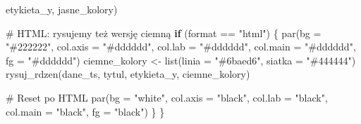 \documentclass[
  polish,
  letterpaper,
  DIV=11,
  numbers=noendperiod]{scrartcl}
\newenvironment{Shaded}{\begin{snugshade}}{\end{snugshade}}
\newcommand{\AttributeTok}[1]{\textcolor[rgb]{0.40,0.45,0.13}{#1}}
\newcommand{\CommentTok}[1]{\textcolor[rgb]{0.37,0.37,0.37}{#1}}
\newcommand{\ControlFlowTok}[1]{\textcolor[rgb]{0.00,0.23,0.31}{\textbf{#1}}}
\newcommand{\FunctionTok}[1]{\textcolor[rgb]{0.28,0.35,0.67}{#1}}
\newcommand{\NormalTok}[1]{\textcolor[rgb]{0.00,0.23,0.31}{#1}}
\newcommand{\OtherTok}[1]{\textcolor[rgb]{0.00,0.23,0.31}{#1}}
\newcommand{\SpecialCharTok}[1]{\textcolor[rgb]{0.37,0.37,0.37}{#1}}
\newcommand{\StringTok}[1]{\textcolor[rgb]{0.13,0.47,0.30}{#1}}
\begin{document}
\begin{Shaded}
\begin{Highlighting}[]
\NormalTok{              etykieta\_y, jasne\_kolory)}
  
  \CommentTok{\# HTML: rysujemy też wersję ciemną}
  \ControlFlowTok{if}\NormalTok{ (format }\SpecialCharTok{==} \StringTok{"html"}\NormalTok{) \{}
    \FunctionTok{par}\NormalTok{(}\AttributeTok{bg =} \StringTok{"\#222222"}\NormalTok{, }\AttributeTok{col.axis =} \StringTok{"\#dddddd"}\NormalTok{, }\AttributeTok{col.lab =} \StringTok{"\#dddddd"}\NormalTok{, }
        \AttributeTok{col.main =} \StringTok{"\#dddddd"}\NormalTok{, }\AttributeTok{fg =} \StringTok{"\#dddddd"}\NormalTok{)}
\NormalTok{    ciemne\_kolory }\OtherTok{\textless{}{-}} \FunctionTok{list}\NormalTok{(}\AttributeTok{linia =} \StringTok{"\#6baed6"}\NormalTok{, }\AttributeTok{siatka =} \StringTok{"\#444444"}\NormalTok{)}
    \FunctionTok{rysuj\_rdzen}\NormalTok{(dane\_ts, tytul, etykieta\_y, ciemne\_kolory)}
    
    \CommentTok{\# Reset po HTML}
    \FunctionTok{par}\NormalTok{(}\AttributeTok{bg =} \StringTok{"white"}\NormalTok{, }\AttributeTok{col.axis =} \StringTok{"black"}\NormalTok{, }\AttributeTok{col.lab =} \StringTok{"black"}\NormalTok{, }
        \AttributeTok{col.main =} \StringTok{"black"}\NormalTok{, }\AttributeTok{fg =} \StringTok{"black"}\NormalTok{)}
\NormalTok{  \}}
\NormalTok{\}}
\end{Highlighting}
\end{Shaded}
\end{document}
